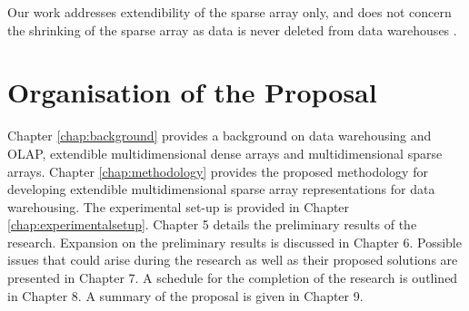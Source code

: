 Our work addresses extendibility of the sparse array only, and does not concern the shrinking of the sparse array as data is never deleted from data warehouses \cite{golfarelli:2009:dwd}.

\section{Organisation of the Proposal}%
Chapter \ref{chap:background} provides a background on data warehousing and OLAP, extendible multidimensional dense arrays and multidimensional sparse arrays. Chapter \ref{chap:methodology} provides the proposed methodology for developing extendible multidimensional sparse array representations for data warehousing. The experimental set-up is provided in Chapter \ref{chap:experimentalsetup}. Chapter 5 details the preliminary results of the research. Expansion on the preliminary results is discussed in Chapter 6. Possible issues that could arise during the research as well as their proposed solutions are presented in Chapter 7. A schedule for the completion of the research is outlined in Chapter 8. A summary of the proposal is given in Chapter 9. 